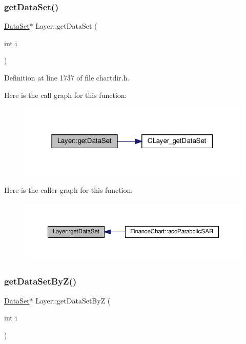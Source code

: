 \subsubsection{\texorpdfstring{get\+Data\+Set()}{getDataSet()}}
{\footnotesize\ttfamily \hyperlink{class_data_set}{Data\+Set}$\ast$ Layer\+::get\+Data\+Set (\begin{DoxyParamCaption}\item[{int}]{i }\end{DoxyParamCaption})\hspace{0.3cm}{\ttfamily [inline]}}



Definition at line 1737 of file chartdir.\+h.

Here is the call graph for this function\+:
\nopagebreak
\begin{figure}[H]
\begin{center}
\leavevmode
\includegraphics[width=315pt]{class_layer_a129db307a7eca2caec1337b22e013d54_cgraph}
\end{center}
\end{figure}
Here is the caller graph for this function\+:
\nopagebreak
\begin{figure}[H]
\begin{center}
\leavevmode
\includegraphics[width=350pt]{class_layer_a129db307a7eca2caec1337b22e013d54_icgraph}
\end{center}
\end{figure}
\mbox{\label{class_layer_a27a86fcb9a2e6d782ccd8a9c5ea1bed7}} 
\subsubsection{\texorpdfstring{get\+Data\+Set\+By\+Z()}{getDataSetByZ()}}
{\footnotesize\ttfamily \hyperlink{class_data_set}{Data\+Set}$\ast$ Layer\+::get\+Data\+Set\+ByZ (\begin{DoxyParamCaption}\item[{int}]{i }\end{DoxyParamCaption})\hspace{0.3cm}{\ttfamily [inline]}}



